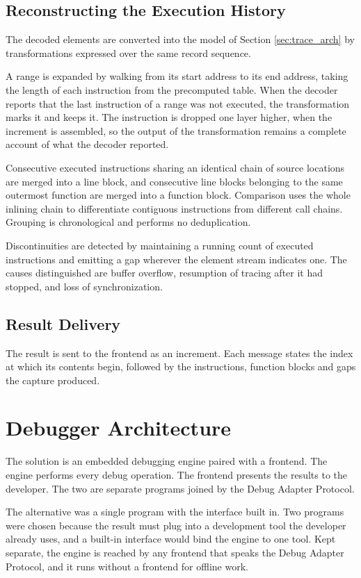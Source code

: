 \subsection{Reconstructing the Execution History}

The decoded elements are converted into the model of Section \ref{sec:trace_arch} by transformations expressed over the same record sequence.

A range is expanded by walking from its start address to its end address, taking the length of each instruction from the precomputed table. When the decoder reports that the last instruction of a range was not executed, the transformation marks it and keeps it. The instruction is dropped one layer higher, when the increment is assembled, so the output of the transformation remains a complete account of what the decoder reported.

Consecutive executed instructions sharing an identical chain of source locations are merged into a line block, and consecutive line blocks belonging to the same outermost function are merged into a function block. Comparison uses the whole inlining chain to differentiate contiguous instructions from different call chains. Grouping is chronological and performs no deduplication.

Discontinuities are detected by maintaining a running count of executed instructions and emitting a gap wherever the element stream indicates one. The causes distinguished are buffer overflow, resumption of tracing after it had stopped, and loss of synchronization.


\subsection{Result Delivery}
The result is sent to the frontend as an increment. Each message states the index at which its contents begin, followed by the instructions, function blocks and gaps the capture produced.


\section{Debugger Architecture}
\label{sec:debugger_arch}
The solution is an embedded debugging engine paired with a frontend. The engine performs every debug operation. The frontend presents the results to the developer. The two are separate programs joined by the Debug Adapter Protocol.

The alternative was a single program with the interface built in. Two programs were chosen because the result must plug into a development tool the developer already uses, and a built-in interface would bind the engine to one tool. Kept separate, the engine is reached by any frontend that speaks the Debug Adapter Protocol, and it runs without a frontend for offline work.

